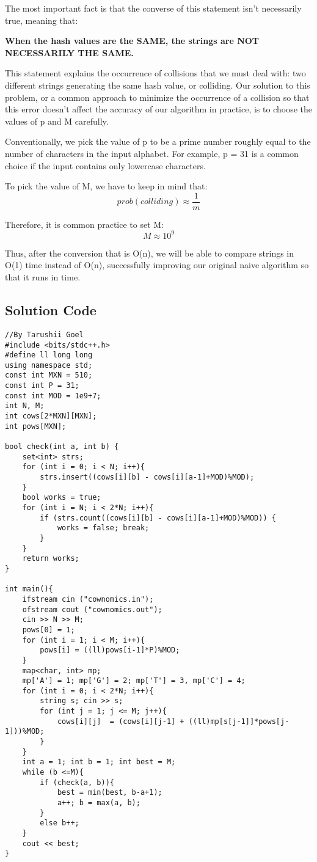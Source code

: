 \documentclass{article}
\begin{document}
\vspace{\baselineskip} 
The most important fact is that the converse of this statement isn't necessarily true, meaning that:

\vspace{\baselineskip} 
\textbf{When the hash values are the SAME, the strings are NOT NECESSARILY THE SAME.}

\vspace{\baselineskip} 
This statement explains the occurrence of collisions that we must deal with: two different strings generating the same hash value, or colliding. Our solution to this problem, or a common approach to minimize the occurrence of a collision so that this error doesn't affect the accuracy of our algorithm in practice, is to choose the values of p and M carefully.

\vspace{\baselineskip} 
Conventionally, we pick the value of p to be a prime number roughly equal to the number of characters in the input alphabet. For example, p = 31 is a common choice if the input contains only lowercase characters.

\vspace{\baselineskip} 
To pick the value of M, we have to keep in mind that:
\[prob(colliding) \approx \frac{1}{m}\]

Therefore, it is common practice to set M:
 \[ M \approx 10^9\]

\vspace{\baselineskip}
Thus, after the conversion that is O(n), we will be able to compare strings in O(1) time instead of O(n), successfully improving our original naive algorithm so that it runs in time. 


 



\subsection{Solution Code}
\begin{lstlisting}
//By Tarushii Goel
#include <bits/stdc++.h>
#define ll long long
using namespace std;
const int MXN = 510;
const int P = 31;
const int MOD = 1e9+7;
int N, M;
int cows[2*MXN][MXN];
int pows[MXN];

bool check(int a, int b) {
	set<int> strs;
	for (int i = 0; i < N; i++){
		strs.insert((cows[i][b] - cows[i][a-1]+MOD)%MOD);
	}
	bool works = true;
	for (int i = N; i < 2*N; i++){
		if (strs.count((cows[i][b] - cows[i][a-1]+MOD)%MOD)) {
			works = false; break;
		}
	}
	return works;
}

int main(){
	ifstream cin ("cownomics.in");
	ofstream cout ("cownomics.out");
	cin >> N >> M;
	pows[0] = 1;
	for (int i = 1; i < M; i++){
		pows[i] = ((ll)pows[i-1]*P)%MOD;
	}
	map<char, int> mp;
	mp['A'] = 1; mp['G'] = 2; mp['T'] = 3, mp['C'] = 4;
	for (int i = 0; i < 2*N; i++){
		string s; cin >> s;
		for (int j = 1; j <= M; j++){
			cows[i][j]  = (cows[i][j-1] + ((ll)mp[s[j-1]]*pows[j-1]))%MOD;
		}
	}
	int a = 1; int b = 1; int best = M;
	while (b <=M){
		if (check(a, b)){
			best = min(best, b-a+1);
			a++; b = max(a, b);
		}
		else b++;
	}
	cout << best;
}
\end{lstlisting}
\end{document}
